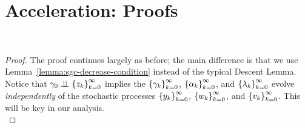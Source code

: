 
\section{Acceleration: Proofs}~\label{app:acceleration}

\charStochasticEstimatingSeq*
\begin{proof}
    The proof continues largely as before; the main difference is that we use Lemma~\ref{lemma:sgc-decrease-condition} instead of the typical Descent Lemma.
    Notice that \( \gamma_0 \perp \!\!\! \perp \left\{z_{k}\right\}_{k=0}^\infty \) implies the \( \left\{\gamma_k\right\}_{k=0}^\infty \), \( \left\{\alpha_k\right\}_{k=0}^\infty \), and \( \left\{\lambda_k\right\}_{k=0}^\infty \) evolve \emph{independently} of the stochastic processes \( \left\{y_k\right\}_{k=0}^\infty \), \( \left\{w_k\right\}_{k=0}^\infty \), and \( \left\{v_k\right\}_{k=0}^\infty \).
    This will be key in our analysis.\\


\end{proof}
